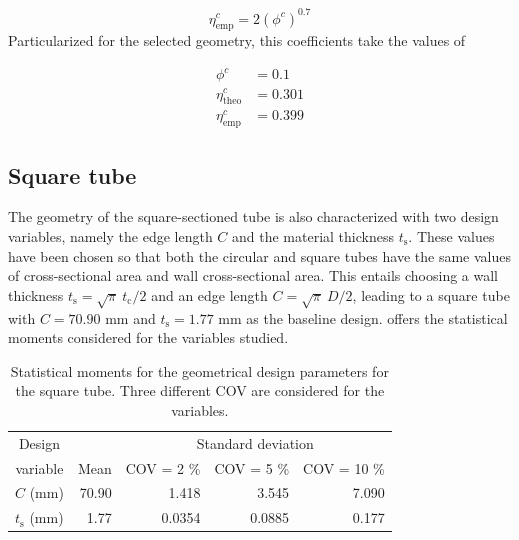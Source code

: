 \documentclass[12pt,number,preprint,review,times]{elsarticle}
\begin{document}
\begin{equation}
\eta_{\mathrm{emp}}^c = 2 {\left(\phi^c\right)}^{0.7}
\end{equation}
Particularized for the selected geometry, this coefficients take the values of

\begin{align}
\phi^c &= 0.1\\ 
\eta_{\mathrm{theo}}^c &= 0.301\\ 
\eta_{\mathrm{emp}}^c &=  0.399
\end{align}

\subsection{Square tube}

The geometry of the square-sectioned tube is also characterized with two design variables, namely the edge length $C$ and the material thickness $t_\mathrm{s}$. These values have been chosen so that both the circular and square tubes have the same values of cross-sectional area and wall cross-sectional area. This entails choosing a wall thickness $t_\mathrm{s} = \sqrt{\pi} \: t_\mathrm{c} / 2$ and an edge length $C = \sqrt{\pi} \: D / 2$, leading to a square tube with $C=70.90$ mm and $t_\mathrm{s} = 1.77$ mm as the baseline design.  offers the statistical moments considered for the variables studied.

\begin{table}[!htpb]
\begin{center}
\small
\begin{tabular}[t]{lrrrr} \toprule
\multicolumn{1}{c}{Design} &  &  \multicolumn{3}{c}{Standard deviation}  \\\cmidrule{3-5}
\multicolumn{1}{c}{variable} & Mean       &   COV = 2 \%  &  COV = 5 \%      &    COV = 10 \%  \\\midrule
$C$ (mm) &  70.90 &  1.418 & 3.545 & 7.090   \\
$t_\mathrm{s}$ (mm) &  1.77 & 0.0354 & 0.0885 & 0.177 \\ %
\bottomrule
\end{tabular}
\captionsetup{justification=centering}
\caption{Statistical moments for the geometrical design parameters for the square tube. Three different COV are considered for the variables.}
\label{tab:vars_sq}
\end{center}
\end{table}
\end{document}
